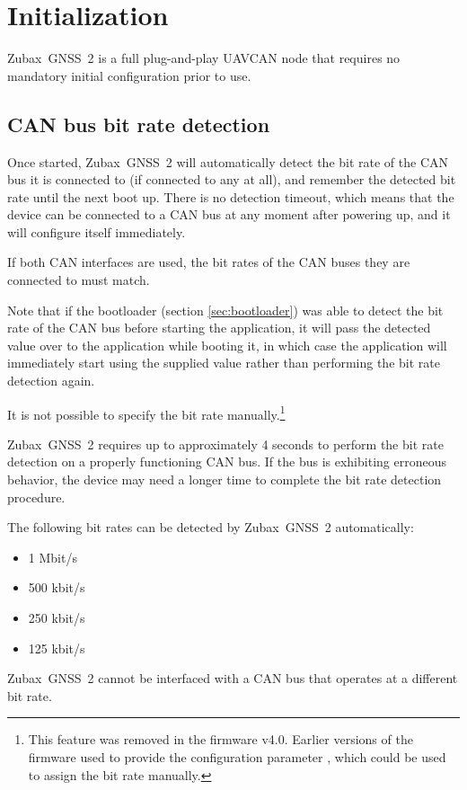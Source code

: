 \documentclass{zubaxdoc}
\begin{document}
\section{Initialization}

Zubax~GNSS~2 is a full plug-and-play UAVCAN node that requires no mandatory initial configuration prior to use.

\subsection{CAN bus bit rate detection}

Once started, Zubax~GNSS~2 will automatically detect the bit rate of the CAN bus it is connected to
(if connected to any at all), and remember the detected bit rate until the next boot up.
There is no detection timeout, which means that the device can be connected to a CAN bus at
any moment after powering up, and it will configure itself immediately.

If both CAN interfaces are used, the bit rates of the CAN buses they are connected to must match.

Note that if the bootloader (section \ref{sec:bootloader}) was able to detect the bit rate of the CAN bus
before starting the application,
it will pass the detected value over to the application while booting it,
in which case the application will immediately start using the supplied value rather than
performing the bit rate detection again.

It is not possible to specify the bit rate manually.\footnote{This feature was removed in the firmware v4.0.
Earlier versions of the firmware used to provide the configuration parameter
, which could be used to assign the bit rate manually.}

Zubax~GNSS~2 requires up to approximately 4 seconds to perform the bit rate detection on a properly
functioning CAN bus.
If the bus is exhibiting erroneous behavior, the device may need a longer time to complete the bit rate
detection procedure.

The following bit rates can be detected by Zubax~GNSS~2 automatically:
\begin{itemize}
    \item 1 Mbit/s
    \item 500 kbit/s
    \item 250 kbit/s
    \item 125 kbit/s
\end{itemize}
Zubax~GNSS~2 cannot be interfaced with a CAN bus that operates at a different bit rate.
\end{document}
